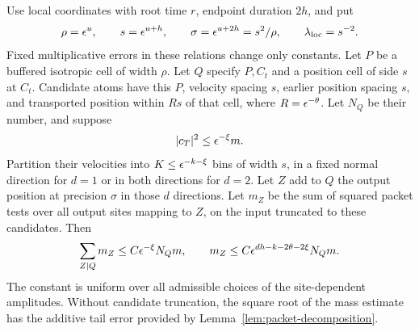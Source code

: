 \begin{lemma}
\label{lem:packet-coherence}
Use local coordinates with root time \(r\), endpoint duration \(2h\),
and put
\[
 \rho=\epsilon^u,\qquad s=\epsilon^{u+h},\qquad
 \sigma=\epsilon^{u+2h}=s^2/\rho,\qquad
 \lambda_{\rm loc}=s^{-2}.
\]
Fixed multiplicative errors in these relations change only constants.
Let \(P\) be a buffered isotropic cell of width \(\rho\).
Let \(Q\) specify \(P,C_t\) and a position cell of side \(s\) at
\(C_t\).  Candidate atoms have this \(P\), velocity spacing \(s\),
earlier position spacing \(s\), and transported position within
\(Rs\) of that cell, where \(R=\epsilon^{-\theta}\).
Let \(N_Q\) be their number, and suppose
\[
 |c_T|^2\leq\epsilon^{-\xi}m.
\]
Partition their velocities into \(K\leq\epsilon^{-k-\xi}\) bins of
width \(s\), in a fixed normal direction for \(d=1\) or in both
directions for \(d=2\).
Let \(Z\) add to \(Q\) the output position at precision \(\sigma\)
in those \(d\) directions.  Let \(m_Z\) be the sum of squared
packet tests over all output sites mapping to \(Z\), on the input
truncated to these candidates.  Then
\begin{equation}
 \sum_{Z\mid Q}m_Z\leq C\epsilon^{-\xi}N_Qm,\qquad
 m_Z\leq C\epsilon^{dh-k-2\theta-2\xi}N_Qm.
 \label{eq:finite-coherence}
\end{equation}
The constant is uniform over all admissible choices of the
site-dependent amplitudes.  Without candidate truncation, the
square root of the mass estimate has the additive tail error
provided by Lemma~\ref{lem:packet-decomposition}.
\end{lemma}

